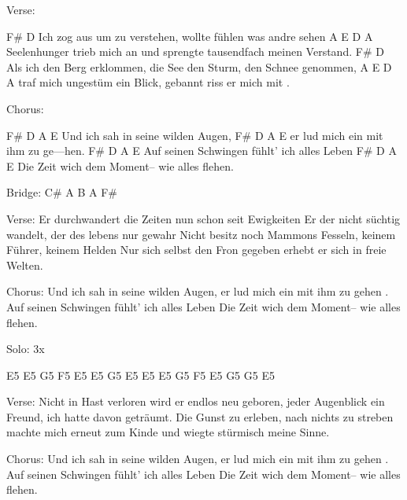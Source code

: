 Verse:

F#                            D
 Ich zog aus um zu verstehen,  wollte fühlen was andre sehen
A            E                          D                  A
Seelenhunger trieb mich an und sprengte tausendfach meinen Verstand.
F#                           D
 Als ich den Berg erklommen,  die See den Sturm, den Schnee genommen,
A              E                 D                  A
 traf mich ungestüm ein Blick, gebannt riss er mich mit .


Chorus:

F#       D            A      E
 Und ich sah in seine wilden Augen,
F#           D              A    E
 er lud mich ein mit ihm zu ge---hen.
F#          D                    A     E
 Auf seinen Schwingen fühlt' ich alles Leben
F#             D               A     E
 Die Zeit wich dem Moment– wie alles flehen.

Bridge:
C# A B A F#

Verse:
Er durchwandert die Zeiten nun schon seit Ewigkeiten
Er der nicht süchtig wandelt, der des lebens nur gewahr
Nicht besitz noch Mammons Fesseln, keinem Führer, keinem Helden
Nur sich selbst den Fron gegeben erhebt er sich in freie Welten.

Chorus:
Und ich sah in seine wilden Augen,
er lud mich ein mit ihm zu gehen .
Auf seinen Schwingen fühlt' ich alles Leben
Die Zeit wich dem Moment– wie alles flehen.

Solo:
3x

E5 E5 G5 F5
E5 E5 G5 E5
E5 E5 G5 F5
E5 G5 G5 E5

Verse:
Nicht in Hast verloren wird er endlos neu geboren,
jeder Augenblick ein Freund, ich hatte davon geträumt.
Die Gunst zu erleben, nach nichts zu streben
machte mich erneut zum Kinde und wiegte stürmisch meine Sinne.

Chorus:
Und ich sah in seine wilden Augen,
er lud mich ein mit ihm zu gehen .
Auf seinen Schwingen fühlt' ich alles Leben
Die Zeit wich dem Moment– wie alles flehen.
